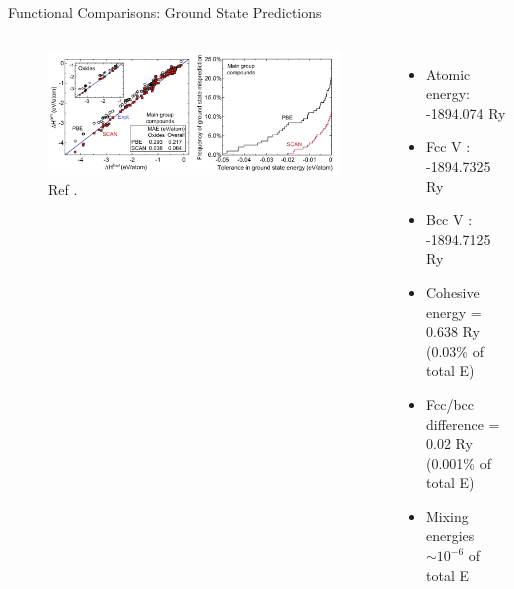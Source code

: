 \documentclass[aspectratio=169]{beamer}
\begin{document}
\begin{frame}{Functional Comparisons: Ground State Predictions}
\begin{columns}
\begin{figure}
    \centering
    \includegraphics[width=\linewidth]{lectures/figures/6_ground_states.png}
    \caption{Ref \cite{zhangEfficientFirstprinciplesPrediction2017}.}
\end{figure}
\begin{itemize}
    \item Atomic energy: -1894.074 Ry
    \item Fcc V : -1894.7325 Ry
    \item Bcc V : -1894.7125 Ry
    \item Cohesive energy = 0.638 Ry (0.03\% of total E)
    \item Fcc/bcc difference = 0.02 Ry (0.001\% of total E)
    \item Mixing energies $\sim 10^{-6}$ of total E
\end{itemize}
\end{columns} 

\end{frame} 
\end{document}
